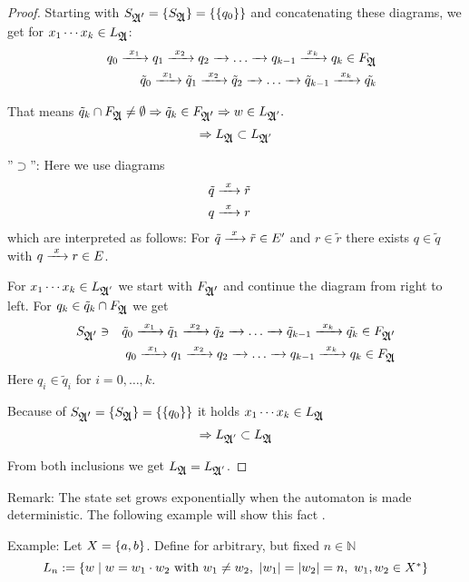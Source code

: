 \begin{proof}
Starting with $S_{\mbox{$\mathfrak{A'}$}} = \mbox{$\{S_{\mbox{$\mathfrak{A}$}}\}$} = \mbox{$\{\mbox{$\{q_0 \}$}\}$}$ and
concatenating these diagrams, we get for $x_1 \cdots x_k \in L_{\mbox{$\mathfrak{A}$}}$:
\begin{eqnarray*}
 & & q_0 \xrightarrow{\ {x_1}\ } q_1 \xrightarrow{\ {x_2}\ } q_2 \xrightarrow{\ {}\ } \ldots \xrightarrow{\ {}\ } q_{k-1} \xrightarrow{\ {x_k}\ }
 q_k \in F_{\mbox{$\mathfrak{A}$}} \\
 & & \tilde{q}_0 \xrightarrow{\ {x_1}\ } \tilde{q}_1 \xrightarrow{\ {x_2}\ } \tilde{q}_2 \xrightarrow{\ {}\ } \ldots
 \xrightarrow{\ {}\ } \tilde{q}_{k-1} \xrightarrow{\ {x_k}\ } \tilde{q_k}
\end{eqnarray*}

That means $\tilde{q}_k \cap F_{\mbox{$\mathfrak{A}$}} \neq \emptyset \Rightarrow \tilde{q}_k
\in F_{\mbox{$\mathfrak{A'}$}} \Rightarrow w \in L_{\mbox{$\mathfrak{A}$}'}.$
\[ \Rightarrow L_{\mbox{$\mathfrak{A}$}} \subset L_{\mbox{$\mathfrak{A}$}'}\]

''$\supset$'': Here we use diagrams  
\begin{eqnarray*}
& \tilde{q} \xrightarrow{\ {x}\ } \tilde{r} & \\
& q \xrightarrow{\ {x}\ } r & 
\end{eqnarray*}
which are interpreted as follows: For $\tilde{q} \xrightarrow{\ {x}\ } \tilde{r} \in E'$ and
$r \in \tilde{r}$ there exists $q \in \tilde{q}$ with $q \xrightarrow{\ {x}\ } r \in E$.

For $x_1 \cdots x_k \in L_{\mbox{$\mathfrak{A}$}'}$ we start with $F_{\mbox{$\mathfrak{A'}$}}$ and continue
the diagram from right to left. For $q_k \in \tilde{q}_k \cap F_{\mbox{$\mathfrak{A}$}}$ we get
\begin{eqnarray*}
 & S_{\mbox{$\mathfrak{A'}$}} \ni & \tilde{q}_0 \xrightarrow{\ {x_1}\ } \tilde{q}_1 \xrightarrow{\ {x_2}\ } \tilde{q}_2
 \xrightarrow{\ {}\ } \ldots \xrightarrow{\ {}\ } \tilde{q}_{k-1} \xrightarrow{\ {x_k}\ } \tilde{q_k} \in F_{\mbox{$\mathfrak{A'}$}}
 \\
 & & q_0 \xrightarrow{\ {x_1}\ } q_1 \xrightarrow{\ {x_2}\ } q_2 \xrightarrow{\ {}\ } \ldots \xrightarrow{\ {}\ } q_{k-1} \xrightarrow{\ {x_k}\ }
 q_k \in F_{\mbox{$\mathfrak{A}$}}
\end{eqnarray*}
Here $q_i \in \tilde{q}_i$ for $i = 0, \ldots, k$.

Because of $S_{\mbox{$\mathfrak{A'}$}} = \mbox{$\{S_{\mbox{$\mathfrak{A}$}}\}$} = \mbox{$\{\mbox{$\{q_0\}$}\}$}$ it holds 
$x_1 \cdots x_k \in L_{\mbox{$\mathfrak{A}$}}$
\[ \Rightarrow L_{\mbox{$\mathfrak{A}$}'} \subset L_{\mbox{$\mathfrak{A}$}} \]

From both inclusions we get $L_{\mbox{$\mathfrak{A}$}} = L_{\mbox{$\mathfrak{A}$}'}$.
\end{proof}

\medskip
Remark: The state set grows exponentially when the automaton is made
deterministic. The following example will show this fact \cite{Commentz}.

\bigskip
Example: Let $X = \mbox{$\{a, b\}$}$. Define for arbitrary, but fixed $n \in
\mathbb{N}$ 
\[ L_n := \mbox{$\{w \mid w = w_1 \cdot w_2 \text{ with } w_1 \neq w_2,\ |w_1| =
|w_2| = n,\ w_1, w_2 \in X^*\}$} \]

